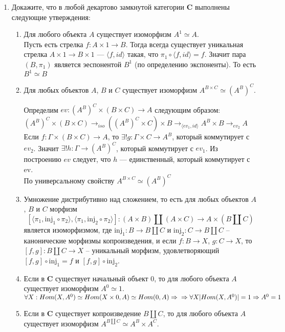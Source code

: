 \documentclass[draft]{article}
\newcommand{\cat}[1]{\mathbf{#1}}
\renewcommand{\C}{\cat{C}}
\newcommand{\inj}{\mathrm{inj}}
\begin{document}
\begin{enumerate}
\item Докажите, что в любой декартово замкнутой категории $\C$ выполнены следующие утверждения:
\begin{enumerate}
\item Для любого объекта $A$ существует изоморфизм $A^1 \simeq A$.\\
Пусть есть стрелка $f: A \times 1 \to B$. Тогда всегда существует уникальная стрелка $A \times 1 \to B \times 1$ --- $\langle f, id\rangle$ такая, что $\pi_1 \circ \langle f, id\rangle = f$. Значит пара $(B, \pi_1)$ является эеспонентой $B^1$ (по определению экспоненты). То есть $B^1 \simeq B$
\item Для любых объектов $A$, $B$ и $C$ существует изоморфизм $A^{B \times C} \simeq (A^B)^C$.

Определим $ev: (A^B)^C\times (B \times C) \to A$ следующим образом:\\
$ (A^B)^C\times (B \times C) \to_{iso} ((A^B)^C\times C) \times B \to_{\langle ev_1 , id\rangle}
A^B \times B \to_{ev_2} A$\\
Если $f: \Gamma \times (B \times C) \to A$, то $\exists! g: \Gamma\times C \to A^B$, который коммутирует с $ev_2$. Значит $\exists! h: \Gamma \to (A^B)^C$, который коммутирует с $ev_1$. Из построению $ev$ следует, что $h$ --- единственный, который коммутирует с ev.\\
По универсальному свойству $A^{B\times C} \simeq (A^B)^C$

\item Умножение дистрибутивно над сложением, то есть для любых объектов $A$, $B$ и $C$ морфизм
\[ [\langle \pi_1, \inj_1 \circ \pi_2 \rangle, \langle \pi_1, \inj_2 \circ \pi_2 \rangle ] : (A \times B) \amalg (A \times C) \to A \times (B \amalg C) \]
является изоморфизмом, где $\inj_1 : B \to B \amalg C$ и $\inj_2 : C \to B \amalg C$ -- канонические морфизмы копроизведения, и
если $f : B \to X$, $g : C \to X$, то $[f,g] : B \amalg C \to X$ -- уникальный морфизм, удовлетворяющий $[f,g] \circ \inj_1 = f$ и $[f,g] \circ \inj_2$.\\

\item Если в $\C$ существует начальный объект 0, то для любого объекта $A$ существует изоморфизм $A^0 \simeq 1$.\\
$\forall X: Hom(X, A^0) \simeq Hom(X \times 0, A)\simeq Hom(0, A) \Rightarrow \\\Rightarrow \forall X |Hom(X, A^0)| = 1\Rightarrow A^0 = 1$
\item Если в $\C$ существует копроизведение $B \amalg C$, то для любого объекта $A$ существует изоморфизм $A^{B \amalg C} \simeq A^B \times A^C$.\\


\end{enumerate}
\end{enumerate}
\end{document}

